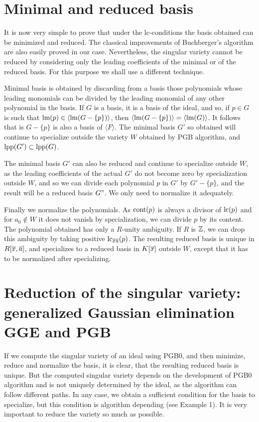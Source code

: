 \section{Minimal and reduced \Gr basis}

It is now very simple to prove that under the lc-conditions the
\Gr basis obtained can be minimized and reduced. The classical
improvements of Buchberger's algorithm are also easily proved in
our case. Nevertheless, the singular variety cannot be reduced by
considering only the leading coefficients of the minimal or of the
reduced basis. For this purpose we shall use a different
technique.

Minimal \Gr basis is obtained by discarding from a \Gr basis those
polynomials whose leading monomials can be divided by the leading
monomial of any other polynomial in the basis. If $G$ is a \Gr
basis, it is a basis of the ideal, and so, if $p \in G $ is such
that $\hbox{\rm lm}(p) \in \langle \hbox{\rm lm}(G-\{p\} ) \rangle $, then $\langle
\hbox{\rm lm}(G-\{p\} ) \rangle = \langle \hbox{\rm lm}(G) \rangle $. It follows that
is $G - \{p\}$ is also a \Gr basis of $\langle F \rangle$. The
minimal \Gr basis $G'$ so obtained will continue to specialize
outside the variety $W$ obtained by {\sc PGB} algorithm, and
$\hbox{\rm lpp}(G') \subset \hbox{\rm lpp}(G)$.

The minimal \Gr basis $G'$ can also be reduced and continue to
specialize outside $W$, as the leading coefficients of the actual
$G'$ do not become zero by specialization outside $W$, and so we
can divide each polynomial $p$ in $G'$ by $G' - \{p\}$, and the
result will be a reduced \Gr basis $G"$. We only need to normalize
it adequately.

Finally we normalize the polynomials. As $\hbox{cont}(p)$ is
always a divisor of $\hbox{\rm lc}(p)$ and for $a_0 \not\in W$ it does not
vanish by specialization, we can divide $p$ by its content. The
polynomial obtained has only a $R$-unity ambiguity. If $R$ is
$\mathbb{Z}$, we can drop this ambiguity by taking positive
$\hbox{\rm lc}_{\overline{x}\overline{a}}(p)$. The resulting reduced \Gr basis is unique in
$R[\overline{x},\overline{a}]$, and specializes to a reduced \Gr basis in $K[\overline{x}]$
outside $W$, except that it has to be normalized after
specializing.

\section{Reduction of the singular variety:
generalized Gaussian elimination GGE and PGB} \label{redvar}

If we compute the singular variety of an ideal using {\sc PGB0},
and then minimize, reduce and normalize the basis, it is clear,
that the resulting reduced \Gr basis is unique. But the computed
singular variety depends on the development of {\sc PGB0}
algorithm and is not uniquely determined by the ideal, as the
algorithm can follow different paths. In any case, we obtain a
sufficient condition for the \Gr basis to specialize, but this
condition is algorithm depending (see Example 1). It is very
important to reduce the variety so much as possible.

